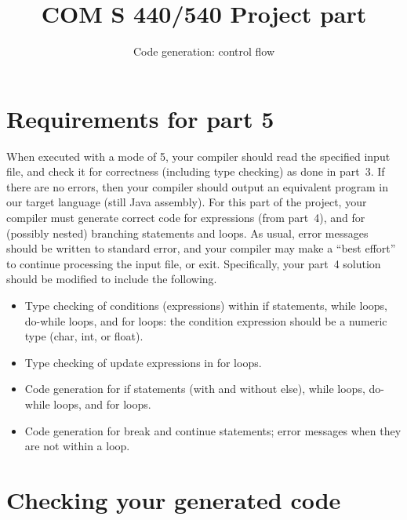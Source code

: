 \documentclass{article}
\title{COM S 440/540 Project part \flowgen}
\author{Code generation: control flow}
\date{}
\newcommand{\typecheck}{3}
\newcommand{\codegen}{4}
\newcommand{\flowgen}{5}
\begin{document}
\maketitle

\section{Requirements for part \flowgen{}}

When executed with a mode of \flowgen{},
your compiler should read the specified input file,
and check it for correctness (including type checking) as done in part~\typecheck.
If there are no errors, then your compiler should output
an equivalent program in our target language
(still Java assembly).
For this part of the project,
your compiler must generate correct code for expressions (from part~\codegen),
and for (possibly nested) branching statements and loops.
As usual,
error messages should be written to standard error,
and your compiler may make a ``best effort'' to continue processing
the input file, or exit.
Specifically, your part~\codegen{} solution should be modified to include
the following.
\begin{itemize}
  \item Type checking of conditions (expressions) within
        if statements, while loops, do-while loops, and
        for loops: the condition expression should be a numeric type
        (char, int, or float).

  \item Type checking of update expressions in for loops.

  \item Code generation for
        if statements (with and without else),
        while loops,
        do-while loops,
        and for loops.

  \item Code generation for break and continue statements;
        error messages when they are not within a loop.

\end{itemize}

\section{Checking your generated code} \label{SEC:checking}
\end{document}
